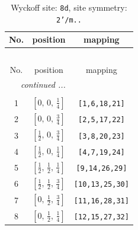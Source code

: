 \documentclass[fleqn,8pt]{jsarticle}
\begin{document}
\begin{longtable}{ccc}
\caption{Wyckoff site: {\tt 8d}, site symmetry: {\tt 2'/m..}}
 \\
 \hline \hline
No. & position & mapping \\ \hline \endfirsthead

\multicolumn{2}{l}{\tablename\ \thetable{}} \\
 \hline \hline
No. & position & mapping \\ \hline \endhead

 \hline \hline
\multicolumn{2}{r}{\footnotesize\it continued ...} \\ \endfoot

 \hline \hline
\multicolumn{2}{r}{} \\ \endlastfoot

1 & $\left[ 0,\, 0,\, \frac{1}{4} \right]$ & {\tt [1,6,18,21]} \\ \hline
2 & $\left[ 0,\, 0,\, \frac{3}{4} \right]$ & {\tt [2,5,17,22]} \\ \hline
3 & $\left[ \frac{1}{2},\, 0,\, \frac{3}{4} \right]$ & {\tt [3,8,20,23]} \\ \hline
4 & $\left[ \frac{1}{2},\, 0,\, \frac{1}{4} \right]$ & {\tt [4,7,19,24]} \\ \hline
5 & $\left[ \frac{1}{2},\, \frac{1}{2},\, \frac{1}{4} \right]$ & {\tt [9,14,26,29]} \\ \hline
6 & $\left[ \frac{1}{2},\, \frac{1}{2},\, \frac{3}{4} \right]$ & {\tt [10,13,25,30]} \\ \hline
7 & $\left[ 0,\, \frac{1}{2},\, \frac{3}{4} \right]$ & {\tt [11,16,28,31]} \\ \hline
8 & $\left[ 0,\, \frac{1}{2},\, \frac{1}{4} \right]$ & {\tt [12,15,27,32]} \\
\end{longtable}
\renewcommand{\arraystretch}{1.2}
\end{document}
